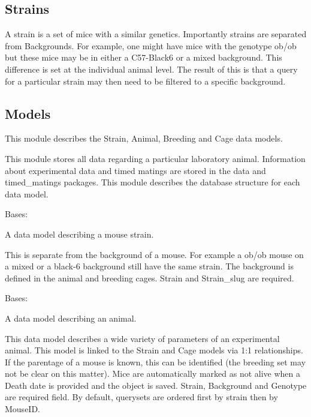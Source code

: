 \documentclass[letterpaper,10pt,english]{sphinxmanual}
\begin{document}
\subsection{Strains}
\label{api:strains}
A strain is a set of mice with a similar genetics.  Importantly strains are separated from Backgrounds.  For example, one might have mice with the genotype ob/ob but these mice may be in either a C57-Black6 or a mixed background.  This difference is set at the individual animal level.  
The result of this is that a query for a particular strain may then need to be filtered to a specific background.


\subsection{Models}
\label{api:id1}\label{api:module-animal.models}
This module describes the Strain, Animal, Breeding and Cage data models.

This module stores all data regarding a particular laboratory animal.  Information about experimental data and timed matings are stored in the data and timed\_matings packages.  This module describes the database structure for each data model.

\begin{fulllineitems}
\label{api:animal.models.Strain}
Bases: 

A data model describing a mouse strain.

This is separate from the background of a mouse.  For example a ob/ob mouse on a mixed or a black-6 background still have the same strain.  The background is defined in the animal and breeding cages.  Strain and Strain\_slug are required.

\end{fulllineitems}


\begin{fulllineitems}
\label{api:animal.models.Animal}
Bases: 

A data model describing an animal.

This data model describes a wide variety of parameters of an experimental animal.  This model is linked to the Strain and Cage models via 1:1 relationships.  If the parentage of a mouse is known, this can be identified (the breeding set may not be clear on this matter). Mice are automatically marked as not alive when a Death date is provided and the object is saved.  Strain, Background and Genotype are required field.  By default, querysets are ordered first by strain then by MouseID.

\end{fulllineitems}
\end{document}
